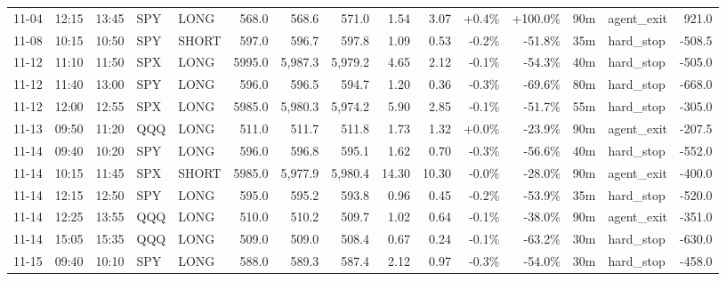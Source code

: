 \documentclass[11pt,a4paper,twoside]{article}
\begin{document}
\begin{landscape}
\begin{center}
\begin{longtable}{>{\color{txtmain}}l l l l l r r r r r r r r >{\color{txtmain}}l r}
11-04 & 12:15 & 13:45 & SPY & LONG & 568.0 & 568.6 & 571.0 & 1.54 & 3.07 & \textcolor{wingreen}{+0.4\%} & \textcolor{wingreen}{+100.0\%} & 90m & agent\_exit & \textcolor{wingreen}{921.0} \\
11-08 & 10:15 & 10:50 & SPY & SHORT & 597.0 & 596.7 & 597.8 & 1.09 & 0.53 & \textcolor{lossred}{-0.2\%} & \textcolor{lossred}{-51.8\%} & 35m & hard\_stop & \textcolor{lossred}{-508.5} \\
11-12 & 11:10 & 11:50 & SPX & LONG & 5995.0 & 5,987.3 & 5,979.2 & 4.65 & 2.12 & \textcolor{lossred}{-0.1\%} & \textcolor{lossred}{-54.3\%} & 40m & hard\_stop & \textcolor{lossred}{-505.0} \\
11-12 & 11:40 & 13:00 & SPY & LONG & 596.0 & 596.5 & 594.7 & 1.20 & 0.36 & \textcolor{lossred}{-0.3\%} & \textcolor{lossred}{-69.6\%} & 80m & hard\_stop & \textcolor{lossred}{-668.0} \\
11-12 & 12:00 & 12:55 & SPX & LONG & 5985.0 & 5,980.3 & 5,974.2 & 5.90 & 2.85 & \textcolor{lossred}{-0.1\%} & \textcolor{lossred}{-51.7\%} & 55m & hard\_stop & \textcolor{lossred}{-305.0} \\
11-13 & 09:50 & 11:20 & QQQ & LONG & 511.0 & 511.7 & 511.8 & 1.73 & 1.32 & \textcolor{wingreen}{+0.0\%} & \textcolor{lossred}{-23.9\%} & 90m & agent\_exit & \textcolor{lossred}{-207.5} \\
11-14 & 09:40 & 10:20 & SPY & LONG & 596.0 & 596.8 & 595.1 & 1.62 & 0.70 & \textcolor{lossred}{-0.3\%} & \textcolor{lossred}{-56.6\%} & 40m & hard\_stop & \textcolor{lossred}{-552.0} \\
11-14 & 10:15 & 11:45 & SPX & SHORT & 5985.0 & 5,977.9 & 5,980.4 & 14.30 & 10.30 & \textcolor{lossred}{-0.0\%} & \textcolor{lossred}{-28.0\%} & 90m & agent\_exit & \textcolor{lossred}{-400.0} \\
11-14 & 12:15 & 12:50 & SPY & LONG & 595.0 & 595.2 & 593.8 & 0.96 & 0.45 & \textcolor{lossred}{-0.2\%} & \textcolor{lossred}{-53.9\%} & 35m & hard\_stop & \textcolor{lossred}{-520.0} \\
11-14 & 12:25 & 13:55 & QQQ & LONG & 510.0 & 510.2 & 509.7 & 1.02 & 0.64 & \textcolor{lossred}{-0.1\%} & \textcolor{lossred}{-38.0\%} & 90m & agent\_exit & \textcolor{lossred}{-351.0} \\
11-14 & 15:05 & 15:35 & QQQ & LONG & 509.0 & 509.0 & 508.4 & 0.67 & 0.24 & \textcolor{lossred}{-0.1\%} & \textcolor{lossred}{-63.2\%} & 30m & hard\_stop & \textcolor{lossred}{-630.0} \\
11-15 & 09:40 & 10:10 & SPY & LONG & 588.0 & 589.3 & 587.4 & 2.12 & 0.97 & \textcolor{lossred}{-0.3\%} & \textcolor{lossred}{-54.0\%} & 30m & hard\_stop & \textcolor{lossred}{-458.0} \\

\end{longtable}
\end{center}
\end{landscape}
\end{document}
